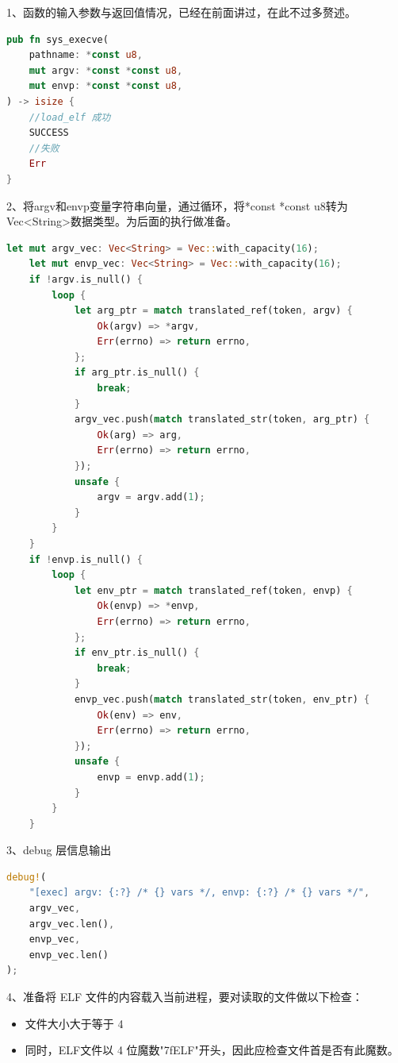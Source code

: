 1、函数的输入参数与返回值情况，已经在前面讲过，在此不过多赘述。
\begin{lstlisting}[language={Rust}, 
    caption={execve输入参数与返回值}]
pub fn sys_execve(
    pathname: *const u8,
    mut argv: *const *const u8,
    mut envp: *const *const u8,
) -> isize {
    //load_elf 成功
    SUCCESS
    //失败
    Err
}
\end{lstlisting}
2、将argv和envp变量字符串向量，通过循环，将*const *const u8转为Vec<String>数据类型。为后面的执行做准备。
\begin{lstlisting}[language={Rust}, 
    caption={execve参数转换}]
let mut argv_vec: Vec<String> = Vec::with_capacity(16);
    let mut envp_vec: Vec<String> = Vec::with_capacity(16);
    if !argv.is_null() {
        loop {
            let arg_ptr = match translated_ref(token, argv) {
                Ok(argv) => *argv,
                Err(errno) => return errno,
            };
            if arg_ptr.is_null() {
                break;
            }
            argv_vec.push(match translated_str(token, arg_ptr) {
                Ok(arg) => arg,
                Err(errno) => return errno,
            });
            unsafe {
                argv = argv.add(1);
            }
        }
    }
    if !envp.is_null() {
        loop {
            let env_ptr = match translated_ref(token, envp) {
                Ok(envp) => *envp,
                Err(errno) => return errno,
            };
            if env_ptr.is_null() {
                break;
            }
            envp_vec.push(match translated_str(token, env_ptr) {
                Ok(env) => env,
                Err(errno) => return errno,
            });
            unsafe {
                envp = envp.add(1);
            }
        }
    }
\end{lstlisting}
3、debug 层信息输出
\begin{lstlisting}[language={Rust}, 
    caption={execve的debug信息}]
debug!(
    "[exec] argv: {:?} /* {} vars */, envp: {:?} /* {} vars */",
    argv_vec,
    argv_vec.len(),
    envp_vec,
    envp_vec.len()
);
\end{lstlisting}
4、准备将 ELF 文件的内容载入当前进程，要对读取的文件做以下检查：
\begin{itemize}
    \item 文件大小大于等于 4
    \item 同时，ELF文件以 4 位魔数"7fELF"开头，因此应检查文件首是否有此魔数。 
\end{itemize}


